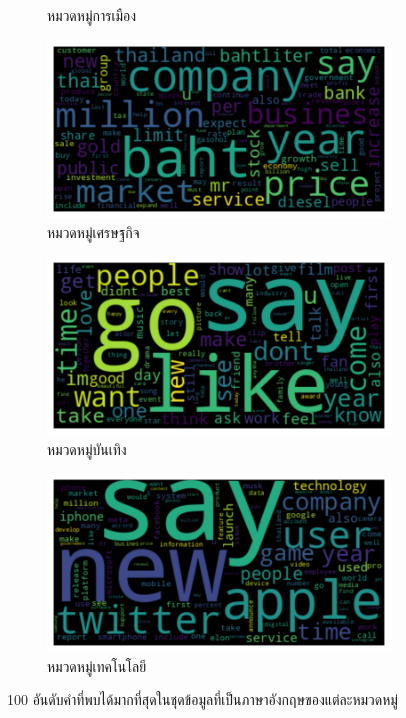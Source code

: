 \documentclass[12pt,oneside,openright,a4paper]{cpe-thai-project}
\begin{document}
\begin{figure}[!ht]
\begin{subfigure}{0.49\textwidth}
            \caption{หมวดหมู่การเมือง}
            \label{fig:subim_eng3}
          \end{subfigure}
          \begin{subfigure}{0.49\textwidth}
            \includegraphics[width=\linewidth]{./img/eng_stat/bus_wc.png} 
            \caption{หมวดหมู่เศรษฐกิจ}
            \label{fig:subim_eng4}
          \end{subfigure}
          \begin{subfigure}{0.49\textwidth}
            \includegraphics[width=\linewidth]{./img/eng_stat/ent_wc.png} 
            \caption{หมวดหมู่บันเทิง}
            \label{fig:subim_eng5}
          \end{subfigure}
          \begin{subfigure}{0.49\textwidth}
            \includegraphics[width=\linewidth]{./img/eng_stat/tech_wc.png} 
            \caption{หมวดหมู่เทคโนโลยี}
            \label{fig:subim_eng6}
          \end{subfigure}
          \caption{100 อันดับคำที่พบได้มากที่สุดในชุดข้อมูลที่เป็นภาษาอังกฤษของแต่ละหมวดหมู่}
          \label{fig:tag_wc_eng}
        \end{figure}
        
\end{document}

